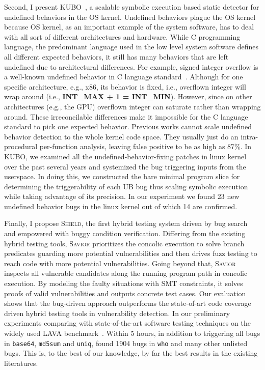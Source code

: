 Second, I present \textsc{KUBO}~\cite{kubo}, a scalable symbolic execution based static detector for undefined behaviors in the OS kernel.
Undefined behaviors plague the OS kernel because OS kernel, as an important example of the system software, has to deal with all sort of different architectures and hardware. 
While C programming language, the predominant language used in the low level system software defines all different expected behaviors, it still has many behaviors that are left undefined due to architectural differences. 
For example, signed integer overflow is a well-known undefined behavior in C language standard~\cite{misc:C-standard}. 
Although for one specific architecture, e.g., x86, its behavior is fixed, i.e., overflown integer will wrap around (i.e., \textbf{INT\_MAX + 1 = INT\_MIN}). 
However, since on other architectures (e.g., the GPU) overflown integer can saturate rather than wrapping around. 
These irreconcilable differences make it impossible for the C language standard to pick one expected behavior. 
Previous works cannot scale undefined behavior detection to the whole kernel code space. 
They usually just do an intra-procedural per-function analysis, leaving false positive to be as high as 87\%. 
In \textsc{KUBO}, we examined all the undefined-behavior-fixing patches in linux kernel over the past several years and systemized the bug triggering inputs from the userspace. 
In doing this, we constructed the bare minimal program slice for determining the triggerability of each UB bug thus scaling symbolic execution while taking advantage of its precision.
In our experiment we found 23 new undefined behavior bugs in the linux kernel out of which 14 are confirmed.

Finally, I propose \textsc{Shield}, the first hybrid testing system driven by bug search and empowered with buggy condition verification. 
Differing from the existing hybrid testing tools, \textsc {Savior} prioritizes the concolic execution to solve branch predicates guarding more potential vulnerabilities and then drives fuzz testing to reach code with more potential vulnerabilities. 
Going beyond that, \textsc {Savior} inspects all vulnerable candidates along the running program path in concolic execution. 
By modeling the faulty situations with SMT constraints, it solves proofs of valid vulnerabilities and outputs concrete test cases. 
Our evaluation shows that the bug-driven approach outperforms the state-of-art code coverage driven hybrid testing tools in vulnerability detection. 
In our preliminary experiments comparing \savior with state-of-the-art software testing techniques on the widely used LAVA benchmark~\cite{lava}. 
Within 5 hours, in addition to triggering all bugs in {\tt base64}, {\tt md5sum} and {\tt uniq}, \savior found 1904 bugs in {\tt who} and many other unlisted bugs. This is, to the best of our knowledge, by far the best results in the existing literatures.


